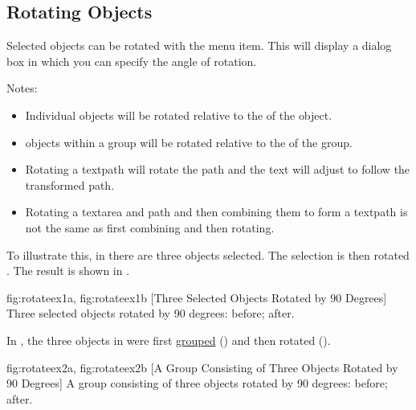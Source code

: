 \subsection{Rotating Objects}\label{sec:rotateobjects}


Selected \glspl{object} can be rotated with the
 menu item. This will display a dialog box in
which you can specify the angle of rotation.

Notes:
\begin{itemize}
\item Individual \glspl{object}
will be rotated relative to the  of the \gls{object}.

\item \Glspl*{object} within a
\gls{group} will be rotated relative to the  of the
group.

\item Rotating a \gls{textpath} will rotate the path and the text
will adjust to follow the transformed path.

\item Rotating a \gls*{textarea} and \gls*{path} and then combining
them to form a \gls*{textpath} is not the same as first combining
and then rotating.

\end{itemize}

To illustrate this, in  there are three
\glspl*{object} selected.  The selection is then rotated
.  The result is shown in .

{
 {fig:rotateex1a}{}{},
 {fig:rotateex1b}{}{}
}
[Three Selected Objects Rotated by 90 Degrees]
{Three selected objects rotated by 90 degrees: 
 before;
 after.}

In , the three objects in
 were first \hyperref[sec:grouping]{grouped}
() and then rotated 
().

{
 {fig:rotateex2a}{}{},
 {fig:rotateex2b}{}{}
}
[A Group Consisting of Three Objects Rotated by 90 Degrees]
{A group consisting of three objects rotated by 90 degrees:
 before;  after.}

